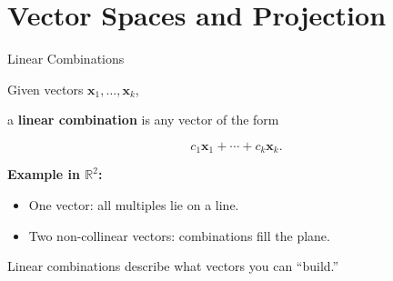 \documentclass[aspectratio=169, handout, t]{beamer}
\numberwithin{equation}{section}
\begin{document}
\section[Projection]{Vector Spaces and Projection}
\begin{frame}{Linear Combinations}

Given vectors $\bm{x}_1, \ldots, \bm{x}_k$,

a \textbf{linear combination} is any vector of the form

\[
c_1 \bm{x}_1 + \cdots + c_k \bm{x}_k.
\]

\vspace{0.4cm}

\textbf{Example in $\mathbb{R}^2$:}

\begin{itemize}
    \item One vector: all multiples lie on a line.\pause
    \item Two non-collinear vectors: combinations fill the plane.
\end{itemize}

\vspace{0.4cm}

Linear combinations describe what vectors you can ``build.''

\end{frame}
\end{document}
